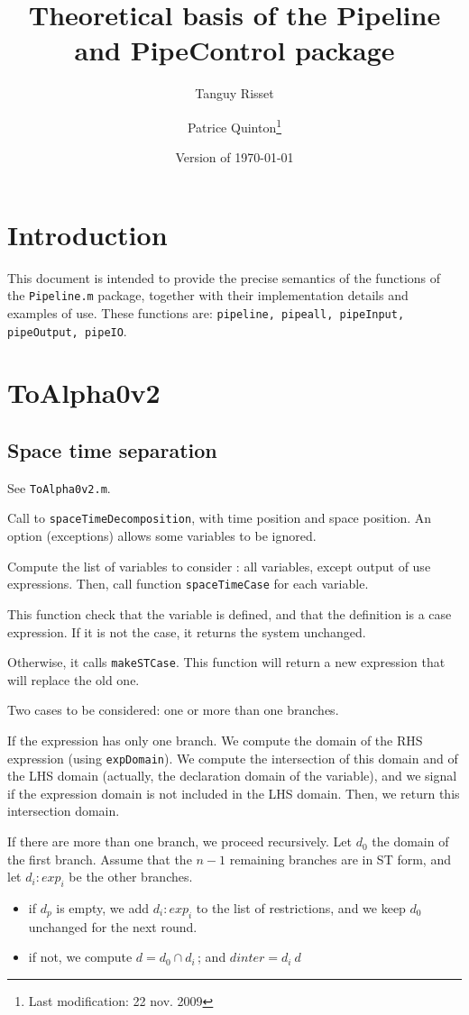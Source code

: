 \documentclass[a4paper,11pt]{article}
\title{Theoretical basis of the Pipeline and PipeControl package}
\author{Tanguy Risset \and Patrice Quinton\footnote{Last modification: 22 nov. 2009}}
\date{Version of \today}
\begin{document}
\maketitle
\section*{Introduction}
This document is intended to provide the precise semantics of 
the functions of the  {\tt Pipeline.m} package, together with 
their implementation details and examples of use.
These functions are: {\tt  pipeline, pipeall, pipeInput, pipeOutput,
pipeIO}.

\section{ToAlpha0v2}
\subsection{Space time separation}
See \texttt{ToAlpha0v2.m}.

Call to \texttt{spaceTimeDecomposition}, with time position and space position.
An option (exceptions) allows some variables to be ignored. 

Compute the list of variables to consider : all variables, except output of 
use expressions. Then, call function \texttt{spaceTimeCase} for each
variable. 

This function check that the variable is defined, and that the definition is
a case expression. If it is not the case, it returns the system unchanged.

Otherwise, it calls \texttt{makeSTCase}. This function will return a new
expression that will replace the old one. 

Two cases to be considered: one or more than one branches. 

If the expression has only one branch. We compute the domain
of the RHS expression (using \texttt{expDomain}). We compute the
intersection of this domain and of the LHS domain (actually, the
declaration domain of the variable), and we
signal if the expression domain is not included in the LHS domain. 
Then, we return this intersection domain.

If there are more than one branch, we proceed recursively. Let $d_0$
the domain of the first branch. Assume that the $n-1$ remaining
branches are in ST form, and let $d_i: exp_i$ be the
other branches. 

\begin{itemize}
\Item compute the intersection $d_p$ of the space projection
of $d_i$ and the space projection of $d_i$\,;
\item if $d_p$ is empty, we add $d_i : exp_i$ to the list
of restrictions, and we keep $d_0$ unchanged for the next
round.
\item if not, we compute $d = d_0 \cap d_i$\,; and $dinter = d_i \ d$
\end{itemize}
\end{document}
